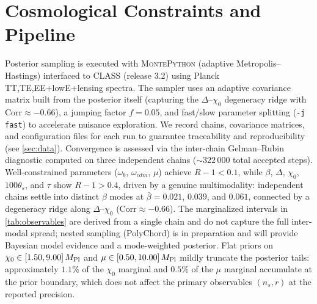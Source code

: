 \documentclass[11pt,a4paper]{article}
\begin{document}
\section{Cosmological Constraints and Pipeline}
\label{sec:constraints}
Posterior sampling is executed with \textsc{MontePython} (adaptive Metropolis--Hastings) interfaced to \textsc{CLASS} (release 3.2) using Planck TT,TE,EE+lowE+lensing spectra. The sampler uses an adaptive covariance matrix built from the posterior itself (capturing the $\Delta$--$\chi_0$ degeneracy ridge with $\mathrm{Corr}\approx-0.66$), a jumping factor $f=0.05$, and fast/slow parameter splitting (\texttt{-j fast}) to accelerate nuisance exploration. We record chains, covariance matrices, and configuration files for each run to guarantee traceability and reproducibility (see \cref{sec:data}). Convergence is assessed via the inter-chain Gelman--Rubin diagnostic computed on three independent chains (${\sim}322\,000$ total accepted steps). Well-constrained parameters ($\omega_b$, $\omega_{cdm}$, $\mu$) achieve $R{-}1<0.1$, while $\beta$, $\Delta$, $\chi_0$, $100\theta_s$, and $\tau$ show $R{-}1>0.4$, driven by a genuine multimodality: independent chains settle into distinct $\beta$ modes at $\bar\beta=0.021$, $0.039$, and $0.061$, connected by a degeneracy ridge along $\Delta$--$\chi_0$ ($\mathrm{Corr}\approx-0.66$). The marginalized intervals in \cref{tab:observables} are derived from a single chain and do not capture the full inter-modal spread; nested sampling (PolyChord) is in preparation and will provide Bayesian model evidence and a mode-weighted posterior. Flat priors on $\chi_0\in[1.50,9.00]\,M_{\rm Pl}$ and $\mu\in[0.50,10.00]\,M_{\rm Pl}$ mildly truncate the posterior tails: approximately $1.1\%$ of the $\chi_0$ marginal and $0.5\%$ of the $\mu$ marginal accumulate at the prior boundary, which does not affect the primary observables $(n_s,r)$ at the reported precision.
\end{document}
